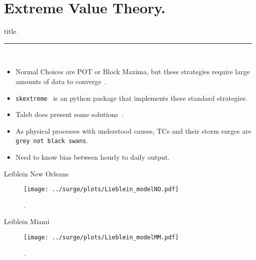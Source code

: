 \section{Extreme Value Theory. }
\begin{frame}[plain]
        \vfill
      \centering
      \begin{beamercolorbox}[sep=8pt,center,shadow=true,rounded=true]{title}
        \insertsectionhead\par%
        \color{oxfordblue}\noindent\rule{10cm}{1pt} \\
        \begin{itemize}
        \item Normal Choices are POT or Block Maxima, but these strategies require
              large amounts of data to converge~\cite{taleb2019much}.
        \item \texttt{skextreme}~\cite{skextremes} is an python package that implements these
              standard strategies.
        \item Taleb does present some solutions~\cite{taleb2019statistical}.
        \item As physical processes with understood causes, TCs
              and their storm surges are \texttt{grey not black swans}.
        \item Need to know bias between hourly to daily output.
        \end{itemize}
      \end{beamercolorbox}
      \vfill
\end{frame}


\begin{frame}{Leiblein New Orleans}
\vspace{-20pt}
 \begin{minipage}{1.0\textwidth}
\begin{figure}[htb!]
    \centering
    \texttt{[image: ../surge/plots/Lieblein\_modelNO.pdf]}
    \vspace{-15pt}
   \caption{. }
    \label{fig:}
\end{figure}
\end{minipage}
\end{frame}

\begin{frame}{Leiblein Miami}
\vspace{-20pt}
 \begin{minipage}{1.0\textwidth}
\begin{figure}[htb!]
    \centering
    \texttt{[image: ../surge/plots/Lieblein\_modelMM.pdf]}
    \vspace{-15pt}
   \caption{. }
    \label{fig:}
\end{figure}
\end{minipage}
\end{frame}


